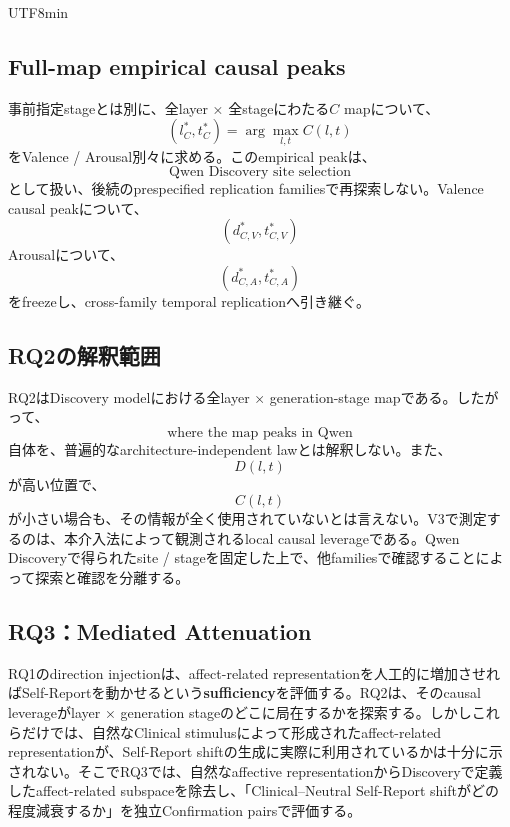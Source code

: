 \documentclass{article} %
\begin{document}
\begin{CJK*}{UTF8}{min}
\subsection{Full-map empirical causal peaks}

事前指定stageとは別に、全layer × 全stageにわたる\(C\) mapについて、
\[
(l_C^{*},t_C^{*})
=
\arg\max_{l,t}C(l,t)
\]
をValence / Arousal別々に求める。このempirical peakは、
\[
\text{Qwen Discovery site selection}
\]
として扱い、後続のprespecified replication familiesで再探索しない。Valence causal peakについて、
\[
(d_{C,V}^{*},t_{C,V}^{*})
\]
Arousalについて、
\[
(d_{C,A}^{*},t_{C,A}^{*})
\]
をfreezeし、cross-family temporal replicationへ引き継ぐ。


\subsection{RQ2の解釈範囲}

RQ2はDiscovery modelにおける全layer × generation-stage mapである。したがって、
\[
\text{where the map peaks in Qwen}
\]
自体を、普遍的なarchitecture-independent lawとは解釈しない。また、
\[
D(l,t)
\]
が高い位置で、
\[
C(l,t)
\]
が小さい場合も、その情報が全く使用されていないとは言えない。V3で測定するのは、本介入法によって観測されるlocal causal leverageである。Qwen Discoveryで得られたsite / stageを固定した上で、他familiesで確認することによって探索と確認を分離する。



\subsection{RQ3：Mediated Attenuation}
\label{app:v3-rq3}

RQ1のdirection injectionは、affect-related representationを人工的に増加させればSelf-Reportを動かせるという\textbf{sufficiency}を評価する。RQ2は、そのcausal leverageがlayer × generation stageのどこに局在するかを探索する。しかしこれらだけでは、自然なClinical stimulusによって形成されたaffect-related representationが、Self-Report shiftの生成に実際に利用されているかは十分に示されない。そこでRQ3では、自然なaffective representationからDiscoveryで定義したaffect-related subspaceを除去し、「Clinical--Neutral Self-Report shiftがどの程度減衰するか」を独立Confirmation pairsで評価する。



\end{CJK*}
\end{document}
